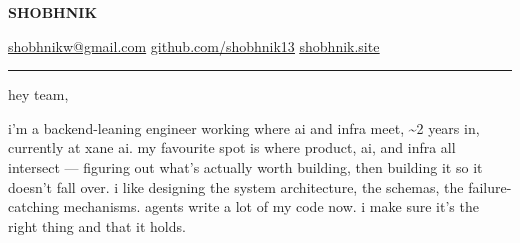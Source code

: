 \documentclass[11pt,a4paper]{article}
\begin{document}
{\fontsize{40}{44}\selectfont\textbf{SHOBHNIK}}

\vspace{14pt}
{\small
\href{mailto:shobhnikw@gmail.com}{shobhnikw@gmail.com}
\hfill \underline{\href{https://github.com/shobhnik13}{github.com/shobhnik13}}
\hfill \underline{\href{https://shobhnik.site}{shobhnik.site}}
}

\vspace{-2pt}
\rule{\linewidth}{1.5pt}

hey team,

i'm a backend-leaning engineer working where ai and infra meet, \textasciitilde 2 years in, currently at xane ai. my favourite spot is where product, ai, and infra all intersect --- figuring out what's actually worth building, then building it so it doesn't fall over. i like designing the system architecture, the schemas, the failure-catching mechanisms. agents write a lot of my code now. i make sure it's the right thing and that it holds.
\end{document}
